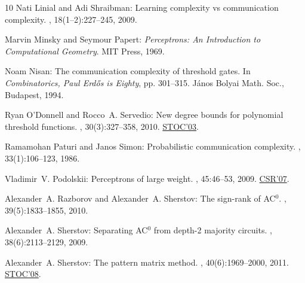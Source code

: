 \documentclass[11pt]{article}
\numberwithin{equation}{section}
\theoremstyle{definition}
\theoremstyle{plain}
\begin{document}
\begin{thebibliography}{10}
{\sc Nati Linial and Adi Shraibman}: Learning complexity vs communication
  complexity.
, 18(1--2):227--245, 2009.
\newblock [\epfmtdoi{10.1017/S0963548308009656}]

{\sc Marvin Minsky and Seymour Papert}: {\em Perceptrons: {A}n Introduction to
  Computational Geometry}.
\newblock MIT Press, 1969.

{\sc Noam Nisan}: The communication complexity of threshold gates.
\newblock In {\em Combinatorics, Paul Erd\H{o}s is Eighty}, pp. 301--315.
  J{\'a}nos Bolyai Math. Soc., Budapest, 1994.

{\sc Ryan O'Donnell and Rocco~A. Servedio}: New degree bounds for polynomial
  threshold functions.
, 30(3):327--358, 2010.
\newblock \prelim \href{https://doi.org/10.1145/780542.780592}{STOC'03}.
\newblock [\epfmtdoi{10.1007/s00493-010-2173-3}]

{\sc Ramamohan Paturi and Janos Simon}: Probabilistic communication complexity.
, 33(1):106--123, 1986.
\newblock [\epfmtdoi{10.1016/0022-0000(86)90046-2}]

{\sc Vladimir~V. Podolskii}: Perceptrons of large weight.
, 45:46--53, 2009.
\newblock \prelim \href{https://doi.org/10.1007/978-3-540-74510-5\_33}{CSR'07}.
\newblock [\epfmtdoi{10.1134/S0032946009010062}]

{\sc Alexander~A. Razborov and Alexander~A. Sherstov}: The sign-rank of
  {AC}$^0$.
, 39(5):1833--1855, 2010.
\newblock [\epfmtdoi{10.1137/080744037}]

{\sc Alexander~A. Sherstov}: Separating {AC}$^0$ from depth-2 majority
  circuits.
, 38(6):2113--2129, 2009.
\newblock [\epfmtdoi{10.1137/08071421X}]

{\sc Alexander~A. Sherstov}: The pattern matrix method.
, 40(6):1969--2000, 2011.
\newblock \prelim \href{https://doi.org/10.1145/1374376.1374392}{STOC'08}.
\newblock [\epfmtdoi{10.1137/080733644}]


\end{thebibliography}
\end{document}
